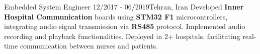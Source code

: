 \resumeSubheadingReza
{Embedded System Engineer}{}
{12/2017 - 06/2019}{Tehran, Iran}
{
    Developed \textbf{Inner Hospital Communication} boards using \textbf{STM32 F1} microcontrollers, integrating audio signal transmission via \textbf{RS485} protocol. Implemented audio recording and playback functionalities. Deployed in 2+ hospitals, facilitating real-time communication between nurses and patients.
}
